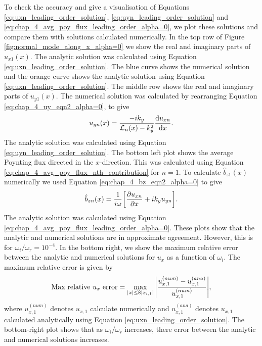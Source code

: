 To check the accuracy and give a visualisation of Equations \eqref{eq:uxn_leading_order_solution}, \eqref{eq:uyn_leading_order_solution} and \eqref{eq:chap_4_avg_poy_flux_leading_order_alpha=0}, we plot these solutions and compare them with solutions calculated numerically. In the top row of Figure \ref{fig:normal_mode_along_x_alpha=0} we show the real and imaginary parts of $u_{x1}(x)$. The analytic solution was calculated using Equation \eqref{eq:uxn_leading_order_solution}. The blue curve shows the numerical solution and the orange curve shows the analytic solution using Equation \eqref{eq:uxn_leading_order_solution}. The middle row shows the real and imaginary parts of $u_{y1}(x)$. The numerical solution was calculated by rearranging Equation \eqref{eq:chap_4_uy_eqn2_alpha=0}, to give
\begin{equation}
    u_{yn}(x)=\frac{-ik_y}{\mathcal{L}_n(x)-k_y^2}\dv{u_{xn}}{x}.
\end{equation}
The analytic solution was calculated using Equation \eqref{eq:uyn_leading_order_solution}.
The bottom left plot shows the average Poynting flux directed in the $x$-direction. This was calculated using Equation \eqref{eq:chap_4_avg_poy_flux_nth_contribution} for $n=1$. To calculate $\hat{b}_{z1}(x)$ numerically we used Equation \eqref{eq:chap_4_bz_eqn2_alpha=0} to give
\begin{equation}
    \hat{b}_{zn}(x)=\frac{1}{i\omega}\qty[\pdv{u_{xn}}{x}+ik_y u_{y n}].
\end{equation}
The analytic solution was calculated using Equation \eqref{eq:chap_4_avg_poy_flux_leading_order_alpha=0}. 
These plots show that the analytic and numerical solutions are in approximate agreement. However, this is for $\omega_i/\omega_r = 10^{-4}$. In the bottom right, we show the maximum relative error between the analytic and numerical solutions for $u_x$ as a function of $\omega_i$. The maximum relative error is given by
\begin{equation}
    \label{eq:chap_4_max_relative_ux_error}
    \text{Max relative $u_x$ error} = \max_{|x|\le 8|x_{i,1}|} \abs{\frac{u_{x,1}^{(num)} - u_{x,1}^{(ana)}}{u_{x,1}^{(num)}}},
\end{equation}
where $u_{x,1}^{(num)}$ denotes $u_{x,1}$ calculate numerically and $u_{x,1}^{(ana)}$ denotes $u_{x,1}$ calculated analytically using Equation \eqref{eq:uxn_leading_order_solution}. The bottom-right plot shows that as $\omega_i/\omega_r$ increases, there error between the analytic and numerical solutions increases.


